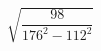 \begin{ex}[type=calculate]
	\begin{condition}
		\( \sqrt{\dfrac{98}{176^2-112^2}} \)
	\end{condition}
\end{ex}